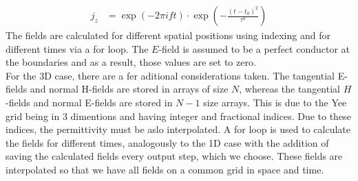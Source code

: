 \documentclass[a4paper,12pt]{scrartcl}
\begin{document}
    \begin{align}
        j_z &= \exp\left(-2\pi ift\right) \cdot \exp\left(-\frac{(t-t_0)^2}{\tau ^2}\right)  
    \end{align}
    The fields are calculated for different spatial positions using indexing and for different times via a for loop. The $E$-field is assumed to be a perfect conductor at the boundaries and as a result, those values are set to zero. \\
    For the 3D case, there are a fer aditional considerations taken. The tangential E-fields and normal H-fields are stored in arrays of size $N$, whereas the tangential $H$-fields and normal E-fields are stored in $N-1$ size arrays. This is due to the Yee grid being in 3 dimentions and having integer and fractional indices. Due to these indices, the permittivity must be aslo interpolated. 
    A for loop is used to calculate the fields for different times, analogously to the 1D case with the addition of saving the calculated fields every output step, which we choose. These fields are interpolated so that we have all fields on a common grid in space and time.

\end{document}
